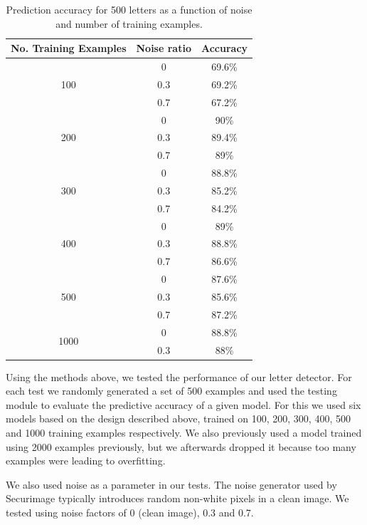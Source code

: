\documentclass[a4paper,12pt]{article}
\begin{document}
\begin{table}
\centering\begin{tabular}{|c|c|c|} \hline

	No. Training Examples & Noise ratio & Accuracy \\ \hline
	\multirow{3}{*}{100}  &	0	&	69.6\% \\ \cline{2-3}
		& 0.3	& 69.2\% \\ \cline{2-3}
		& 0.7	& 67.2\% \\ \hline
	\multirow{3}{*}{200}  & 0	& 90\% \\ \cline{2-3}
		& 0.3	& 89.4\% \\ \cline{2-3}
		& 0.7	& 89\% \\ \hline
	\multirow{3}{*}{300}  & 0	& 88.8\% \\ \cline{2-3}
		& 0.3	& 85.2\% \\ \cline{2-3}
		& 0.7	& 84.2\% \\ \hline
	\multirow{3}{*}{400}  & 0	& 89\% \\ \cline{2-3}
		& 0.3	& 88.8\% \\ \cline{2-3}
		& 0.7	& 86.6\% \\ \hline
	\multirow{3}{*}{500}  & 0	& 87.6\%\\ \cline{2-3}
		& 0.3	& 85.6\% \\ \cline{2-3}
		& 0.7	& 87.2\% \\ \hline
	\multirow{2}{*}{1000}  & 0	& 88.8\% \\ \cline{2-3}
		& 0.3	& 88\% \\ \hline

\end{tabular}
\caption{Prediction accuracy for 500 letters as a function of noise and number
of training examples.}
\label{tab:results-accuracy}
\end{table}

Using the methods above, we tested the performance of our letter detector. For
each test we randomly generated a set of 500 examples and used the testing
module to evaluate the predictive accuracy of a given model. For this we used
six models based on the design described above, trained on 100, 200, 300, 400,
500 and 1000 training examples respectively. We also previously used a model
trained using 2000 examples previously, but we afterwards dropped it because
too many examples were leading to overfitting.

We also used noise as a parameter in our tests. The noise generator used by
Securimage typically introduces random non-white pixels in a clean image. We
tested using noise factors of 0 (clean image), 0.3 and 0.7.
\end{document}
